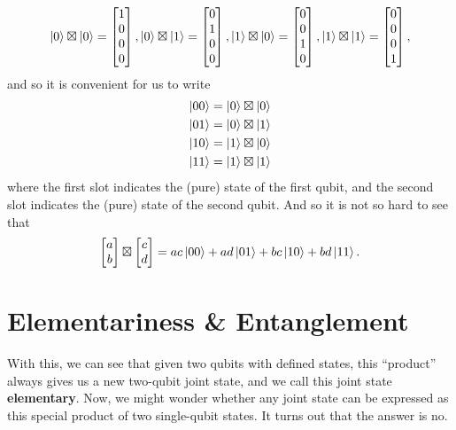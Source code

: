 \documentclass[a4paper,11pt]{article}
\numberwithin{equation}{section}
\theoremstyle{definition}
\begin{document}
\begin{align*}
\left\vert{0}\right\rangle\boxtimes \left\vert{0}\right\rangle
=
\begin{bmatrix}
1\\0\\0\\0
\end{bmatrix}, \left\vert{0}\right\rangle\boxtimes \left\vert{1}\right\rangle
=
\begin{bmatrix}
0\\1\\0\\0
\end{bmatrix}, \left\vert{1}\right\rangle\boxtimes \left\vert{0}\right\rangle
=
\begin{bmatrix}
0\\0\\1\\0
\end{bmatrix}, \left\vert{1}\right\rangle\boxtimes \left\vert{1}\right\rangle
=
\begin{bmatrix}
0\\0\\0\\1
\end{bmatrix}, 
\end{align*}
and so it is convenient for us to write
\begin{align*}
\left\vert{00}\right\rangle = \left\vert{0}\right\rangle \boxtimes \left\vert{0}\right\rangle\\
\left\vert{01}\right\rangle = \left\vert{0}\right\rangle \boxtimes \left\vert{1}\right\rangle\\
\left\vert{10}\right\rangle = \left\vert{1}\right\rangle \boxtimes \left\vert{0}\right\rangle\\
\left\vert{11}\right\rangle = \left\vert{1}\right\rangle \boxtimes \left\vert{1}\right\rangle
\end{align*}
where the first slot indicates the (pure) state of the first qubit, and the second slot indicates the (pure) state of the second qubit. And so it is not so hard to see that
\begin{align*}
\begin{bmatrix}
a\\b
\end{bmatrix}
\boxtimes
\begin{bmatrix}
c\\d
\end{bmatrix} = ac\left\vert{00}\right\rangle + ad\left\vert{01}\right\rangle + bc\left\vert{10}\right\rangle + bd\left\vert{11}\right\rangle. 
\end{align*}

\section{Elementariness \& Entanglement}
With this, we can see that given two qubits with defined states, this ``product'' always gives us a new two-qubit joint state, and we call this joint state \textbf{elementary}. Now, we might wonder whether any joint state can be expressed as this special product of two single-qubit states. It turns out that the answer is no. 
\end{document}
